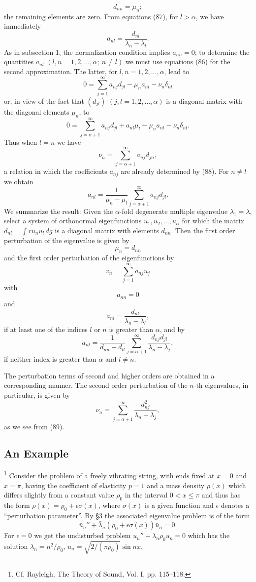 \[
d_{nn}=\mu_n;
\]
the remaining elements are zero. From equations (87), for $l>\alpha$, we have immediately
\begin{equation}
a_{nl}=\frac{d_{nl}}{\lambda_n-\lambda_l}.
\tag{88}
\end{equation}
As in subsection 1, the normalization condition implies $a_{nn}=0$; to determine the quantities $a_{nl}$ $(l,n=1,2,\ldots,\alpha;\ n\ne l)$ we must use equations (86) for the second approximation. The latter, for $l,n=1,2,\ldots,\alpha$, lead to
\[
0=\sum_{j=1}^{\infty}a_{nj}d_{jl}-\mu_na_{nl}-\nu_n\delta_{nl}
\]
or, in view of the fact that $(d_{jl})$ $(j,l=1,2,\ldots,\alpha)$ is a diagonal matrix with the diagonal elements $\mu_n$, to
\[
0=\sum_{j=\alpha+1}^{\infty}a_{nj}d_{jl}+a_{nl}\mu_l-\mu_na_{nl}-\nu_n\delta_{nl}.
\]
Thus when $l=n$ we have
\begin{equation}
\nu_n=\sum_{j=\alpha+1}^{\infty}a_{nj}d_{jn},
\tag{89}
\end{equation}
a relation in which the coefficients $a_{nj}$ are already determined by (88). For $n\ne l$ we obtain
\[
a_{nl}=\frac1{\mu_n-\mu_l}\sum_{j=\alpha+1}^{\infty}a_{nj}d_{jl}.
\]
We summarize the result: Given the $\alpha$-fold degenerate multiple eigenvalue $\lambda_1=\lambda$, select a system of orthonormal eigenfunctions $u_1,u_2,\ldots,u_\alpha$ for which the matrix $d_{nl}=\int ru_nu_l\,dg$ is a diagonal matrix with elements $d_{nn}$. Then the first order perturbation of the eigenvalue is given by
\[
\mu_n=d_{nn}
\]
and the first order perturbation of the eigenfunctions by
\[
v_n=\sum_{j=1}^{\infty}a_{nj}u_j
\]
with
\[
a_{nn}=0
\]
and
\[
a_{nl}=\frac{d_{nl}}{\lambda_n-\lambda_l},
\]
if at least one of the indices $l$ or $n$ is greater than $\alpha$, and by
\[
a_{nl}=\frac1{d_{nn}-d_{ll}}\sum_{j=\alpha+1}^{\infty}\frac{d_{nj}d_{jl}}{\lambda_n-\lambda_j},
\]
if neither index is greater than $\alpha$ and $l\ne n$.

The perturbation terms of second and higher orders are obtained in a corresponding manner. The second order perturbation of the $n$-th eigenvalues, in particular, is given by
\[
\nu_n=\sum_{j=\alpha+1}^{\infty}\frac{d_{nj}^2}{\lambda_n-\lambda_j},
\]
as we see from (89).

\subsection{An Example}
\footnote{Cf. Rayleigh, The Theory of Sound, Vol. I, pp. 115--118.} Consider the problem of a freely vibrating string, with ends fixed at $x=0$ and $x=\pi$, having the coefficient of elasticity $p=1$ and a mass density $\rho(x)$ which differs slightly from a constant value $\rho_0$ in the interval $0<x\le\pi$ and thus has the form $\rho(x)=\rho_0+\epsilon\sigma(x)$, where $\sigma(x)$ is a given function and $\epsilon$ denotes a ``perturbation parameter''. By \S3 the associated eigenvalue problem is of the form
\begin{equation}
\bar u_n''+\bar\lambda_n(\rho_0+\epsilon\sigma(x))\bar u_n=0.
\tag{90}
\end{equation}
For $\epsilon=0$ we get the undisturbed problem $u_n''+\lambda_n\rho_0u_n=0$ which has the solution $\lambda_n=n^2/\rho_0$, $u_n=\sqrt{2/(\pi\rho_0)}\sin nx$.

